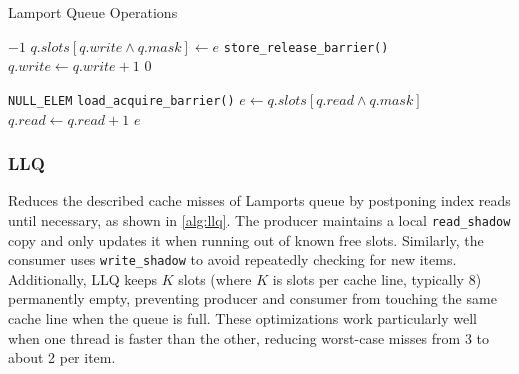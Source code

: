 \begin{algorithm}[!ht]
   \centering
   \captionsetup{justification=centering}
   \caption{Lamport Queue Operations \cite{MaffioneCacheAware}}
   \label{alg:lamport-queue}
   \scriptsize
   \begin{algorithmic}[1]
            
               \State \Return $-1$ 
           \EndIf
           \State $q.slots[q.write \land q.mask] \gets e$
           \State \texttt{store\_release\_barrier()}
           \State $q.write \gets q.write + 1$
           \State \Return $0$
       \EndFunction
       
       \State
       
            
               \State \Return \texttt{NULL\_ELEM} 
           \EndIf
           \State \texttt{load\_acquire\_barrier()}
           \State $e \gets q.slots[q.read \land q.mask]$
           \State $q.read \gets q.read + 1$
           \State \Return $e$
       \EndFunction
   \end{algorithmic}
   \cite{MaffioneCacheAware}
\end{algorithm}

\subsubsection{\acf{LLQ}}
Reduces the described cache misses of Lamports queue by postponing index reads until necessary, as shown in \cref{alg:llq}. The producer maintains a local \texttt{read\_shadow} copy and only updates it when running out of known free slots. Similarly, the consumer uses \texttt{write\_shadow} to avoid repeatedly checking for new items. Additionally, LLQ keeps $K$ slots (where $K$ is slots per cache line, typically 8) permanently empty, preventing producer and consumer from touching the same cache line when the queue is full. These optimizations work particularly well when one thread is faster than the other, reducing worst-case misses from 3 to about 2 per item. \cite{MaffioneCacheAware}


